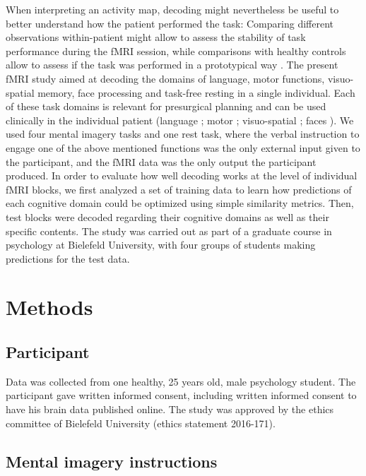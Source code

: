 \documentclass[fleqn,10pt]{SelfArx} %
\begin{document}
When interpreting an activity map, decoding might nevertheless be useful to better understand how the patient performed the task: Comparing different observations within-patient might allow to assess the stability of task performance during the fMRI session, while comparisons with healthy controls allow to assess if the task was performed in a prototypical way \citep{Dubois_2016}.
The present fMRI study aimed at decoding the domains of language, motor functions, visuo-spatial memory, face processing and task-free resting in a single individual. Each of these task domains is relevant for presurgical planning and can be used clinically in the individual patient (language \citep{Woermann_2003}; motor \citep{Haberg_2004}; visuo-spatial \citep{Jokeit_2001}; faces \citep{Parvizi_2012}). We used four mental imagery tasks and one rest task, where the verbal instruction to engage one of the above mentioned functions was the only external input given to the participant, and the fMRI data was the only output the participant produced. 
In order to evaluate how well decoding works at the level of individual fMRI blocks, we first analyzed a set of training data to learn how predictions of each cognitive domain could be optimized using simple similarity metrics. Then, test blocks were decoded regarding their cognitive domains as well as their specific contents. The study was carried out as part of a graduate course in psychology at Bielefeld University, with four groups of students making predictions for the test data.

\section{Methods}

\subsection{Participant}

Data was collected from one healthy, 25 years old, male psychology student. The participant gave written informed consent, including written informed consent to have his brain data published online. The study was approved by the ethics committee of Bielefeld University (ethics statement 2016-171).

\subsection{Mental imagery instructions}
\end{document}
